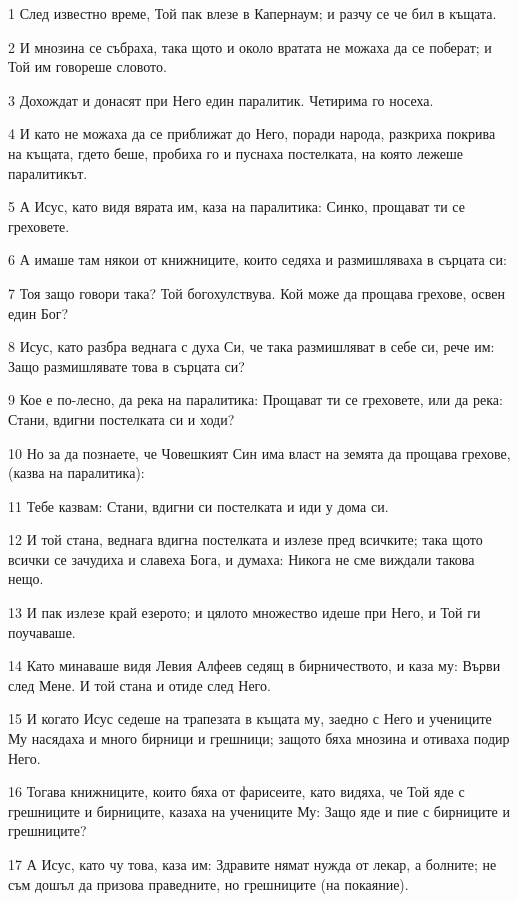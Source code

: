 \par 1 След известно време, Той пак влезе в Капернаум; и разчу се че бил в къщата.
\par 2 И мнозина се събраха, така щото и около вратата не можаха да се поберат; и Той им говореше словото.
\par 3 Дохождат и донасят при Него един паралитик. Четирима го носеха.
\par 4 И като не можаха да се приближат до Него, поради народа, разкриха покрива на къщата, гдето беше, пробиха го и пуснаха постелката, на която лежеше паралитикът.
\par 5 А Исус, като видя вярата им, каза на паралитика: Синко, прощават ти се греховете.
\par 6 А имаше там някои от книжниците, които седяха и размишляваха в сърцата си:
\par 7 Тоя защо говори така? Той богохулствува. Кой може да прощава грехове, освен един Бог?
\par 8 Исус, като разбра веднага с духа Си, че така размишляват в себе си, рече им: Защо размишлявате това в сърцата си?
\par 9 Кое е по-лесно, да река на паралитика: Прощават ти се греховете, или да река: Стани, вдигни постелката си и ходи?
\par 10 Но за да познаете, че Човешкият Син има власт на земята да прощава грехове, (казва на паралитика):
\par 11 Тебе казвам: Стани, вдигни си постелката и иди у дома си.
\par 12 И той стана, веднага вдигна постелката и излезе пред всичките; така щото всички се зачудиха и славеха Бога, и думаха: Никога не сме виждали такова нещо.
\par 13 И пак излезе край езерото; и цялото множество идеше при Него, и Той ги поучаваше.
\par 14 Като минаваше видя Левия Алфеев седящ в бирничеството, и каза му: Върви след Мене. И той стана и отиде след Него.
\par 15 И когато Исус седеше на трапезата в къщата му, заедно с Него и учениците Му насядаха и много бирници и грешници; защото бяха мнозина и отиваха подир Него.
\par 16 Тогава книжниците, които бяха от фарисеите, като видяха, че Той яде с грешниците и бирниците, казаха на учениците Му: Защо яде и пие с бирниците и грешниците?
\par 17 А Исус, като чу това, каза им: Здравите нямат нужда от лекар, а болните; не съм дошъл да призова праведните, но грешниците (на покаяние).
